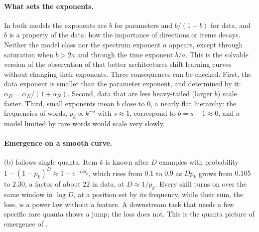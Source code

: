 \begin{refsection}
\paragraph{What sets the exponents.} In both models the exponents are $b$ for parameters and $b/(1+b)$ for data, and $b$ is a property of the data: how the importance of directions or items decays. Neither the model class nor the spectrum exponent $a$ appears, except through saturation when $b>2a$ and through the time exponent $b/a$. This is the solvable version of the observation of \textcite{HestnessEtAl2017} that better architectures shift learning curves without changing their exponents. Three consequences can be checked. First, the data exponent is smaller than the parameter exponent, and determined by it: $\alpha_D=\alpha_N/(1+\alpha_N)$. Second, data that are less heavy-tailed (larger $b$) scale faster. Third, small exponents mean $b$ close to $0$, a nearly flat hierarchy: the frequencies of words, $p_k\propto k^{-s}$ with $s\approx1$, correspond to $b=s-1\approx0$, and a model limited by rare words would scale very slowly.

\paragraph{Emergence on a smooth curve.} (b) follows single quanta. Item $k$ is known after $D$ examples with probability $1-(1-p_k)^D\approx1-e^{-Dp_k}$, which rises from $0.1$ to $0.9$ as $Dp_k$ grows from $0.105$ to $2.30$, a factor of about $22$ in data, at $D\approx1/p_k$. Every skill turns on over the same window in $\log D$, at a position set by its frequency, while their sum, the loss, is a power law without a feature. A downstream task that needs a few specific rare quanta shows a jump; the loss does not. This is the quanta picture of emergence of \textcite{MichaudEtAl2023}.


\end{refsection}
